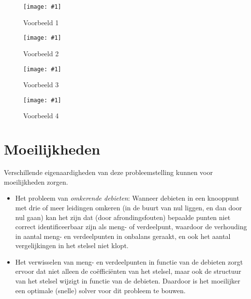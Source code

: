 \documentclass[12pt]{article}
\newcommand{\jpeg}[3]{
	\begin{figure}
	  \centering
	  \texttt{[image: \#1]}
	  \caption{#2}
	  \label{#3}
	\end{figure}
}
\begin{document}
\jpeg{Example1.JPG}{Voorbeeld 1}{fig:ex1}
\jpeg{Example2.JPG}{Voorbeeld 2}{fig:ex2}
\jpeg{Example3.JPG}{Voorbeeld 3}{fig:ex3}
\jpeg{Example4.JPG}{Voorbeeld 4}{fig:ex4}

\cleardoublepage

\section{Moeilijkheden}

Verschillende eigenaardigheden van deze probleemstelling kunnen voor moeilijkheden zorgen.

\begin{itemize}
\item Het probleem van \emph{omkerende debieten}: Wanneer debieten in een knooppunt met drie of meer leidingen omkeren (in de buurt van nul liggen, en dan door nul gaan) kan het zijn dat (door afrondingsfouten) bepaalde punten niet correct identificeerbaar zijn als meng- of verdeelpunt, waardoor de verhouding in aantal meng- en verdeelpunten in onbalans geraakt, en ook het aantal vergelijkingen in het stelsel niet klopt. 
\item Het verwisselen van meng- en verdeelpunten in functie van de debieten zorgt ervoor dat niet alleen de coëfficiënten van het stelsel, maar ook de structuur van het stelsel wijzigt in functie van de debieten. Daardoor is het moeilijker een optimale (snelle) solver voor dit probleem te bouwen.
\end{itemize} 
\end{document}
